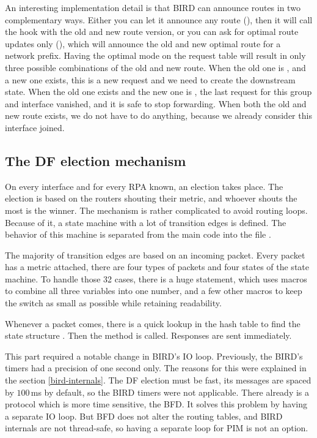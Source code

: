 An interesting implementation detail is that BIRD can announce routes in two
complementary ways. Either you can let it announce any route (),
then it will call the  hook with the old and new route version,
or you can ask for optimal route updates only (), which will
announce the old and new optimal route for a network prefix. Having the optimal
mode on the request table will result in only three possible combinations of
the old and new route. When the old one is \NULL, and a new one exists, this is a new
request and we need to create the downstream state. When the old one exists and
the new one is \NULL, the last request for this group and interface vanished,
and it is safe to stop forwarding. When both the old and new route exists, we
do not have to do anything, because we already consider this interface joined.

\subsection{The DF election mechanism}
On every interface and for every RPA known, an election takes place. The
election is based on the routers shouting their metric, and whoever shouts the
most is the winner. The mechanism is rather complicated to avoid routing loops.
Because of it, a state machine with a lot of transition edges is defined. The
behavior of this machine is separated from the main code into the file
.

The majority of transition edges are based on an incoming packet. Every packet
has a metric attached, there are four types of packets and four states of the
state machine. To handle those 32 cases, there is a huge 
statement, which uses macros to combine all three variables into one number,
and a few other macros to keep the switch as small as possible while retaining
readability.

Whenever a packet comes, there is a quick lookup in the hash table to find the
state structure . Then the  method is
called. Responses are sent immediately.

This part required a notable change in BIRD's IO loop. Previously, the BIRD's
timers had a precision of one second only. The reasons for this were explained
in the section \ref{bird-internals}. The DF election must be fast, its
messages are spaced by $100\,$ms by default, so the BIRD timers were not
applicable. There already is a protocol which is more time sensitive, the BFD. It
solves this problem by having a separate IO loop. But BFD does not alter the
routing tables, and BIRD internals are not thread-safe, so having a separate
loop for PIM is not an option.

